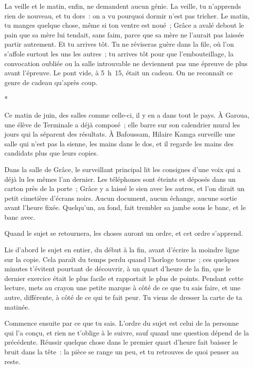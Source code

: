 \documentclass[10.5pt,twoside,openright]{book}
\newcommand{\asterisme}{\par\vspace{0.7em}\centerline{\color{gris}*\quad*\quad*}\vspace{0.7em}\par\noindent}
\begin{document}
La veille et le matin, enfin, ne demandent aucun génie. La veille, tu n’apprends rien de nouveau, et tu dors : on a vu pourquoi dormir n’est pas tricher. Le matin, tu manges quelque chose, même si ton ventre est noué ; Grâce a avalé debout le pain que sa mère lui tendait, sans faim, parce que sa mère ne l’aurait pas laissée partir autrement. Et tu arrives tôt. Tu ne réviseras guère dans la file, où l’on s’affole surtout les uns les autres ; tu arrives tôt pour que l’embouteillage, la convocation oubliée ou la salle introuvable ne deviennent pas une épreuve de plus avant l’épreuve. Le pont vide, à 5 h 15, était un cadeau. On ne reconnaît ce genre de cadeau qu’après coup.

\asterisme

Ce matin de juin, des salles comme celle-ci, il y en a dans tout le pays. À Garoua, une élève de Terminale a déjà composé ; elle barre sur son calendrier mural les jours qui la séparent des résultats. À Bafoussam, Hilaire Kamga surveille une salle qui n’est pas la sienne, les mains dans le dos, et il regarde les mains des candidats plus que leurs copies.

Dans la salle de Grâce, le surveillant principal lit les consignes d’une voix qui a déjà lu les mêmes l’an dernier. Les téléphones sont éteints et déposés dans un carton près de la porte ; Grâce y a laissé le sien avec les autres, et l’on dirait un petit cimetière d’écrans noirs. Aucun document, aucun échange, aucune sortie avant l’heure fixée. Quelqu’un, au fond, fait trembler sa jambe sous le banc, et le banc avec.

Quand le sujet se retournera, les choses auront un ordre, et cet ordre s’apprend.

Lis d’abord le sujet en entier, du début à la fin, avant d’écrire la moindre ligne sur la copie. Cela paraît du temps perdu quand l’horloge tourne ; ces quelques minutes t’évitent pourtant de découvrir, à un quart d’heure de la fin, que le dernier exercice était le plus facile et rapportait le plus de points. Pendant cette lecture, mets au crayon une petite marque à côté de ce que tu sais faire, et une autre, différente, à côté de ce qui te fait peur. Tu viens de dresser la carte de ta matinée.

Commence ensuite par ce que tu sais. L’ordre du sujet est celui de la personne qui l’a conçu, et rien ne t’oblige à le suivre, sauf quand une question dépend de la précédente. Réussir quelque chose dans le premier quart d’heure fait baisser le bruit dans la tête : la pièce se range un peu, et tu retrouves de quoi penser au reste.
\end{document}
